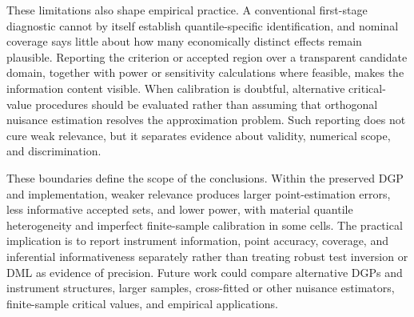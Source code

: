 These limitations also shape empirical practice. A conventional first-stage diagnostic cannot by itself establish quantile-specific identification, and nominal coverage says little about how many economically distinct effects remain plausible. Reporting the criterion or accepted region over a transparent candidate domain, together with power or sensitivity calculations where feasible, makes the information content visible. When calibration is doubtful, alternative critical-value procedures should be evaluated rather than assuming that orthogonal nuisance estimation resolves the approximation problem. Such reporting does not cure weak relevance, but it separates evidence about validity, numerical scope, and discrimination.

These boundaries define the scope of the conclusions. Within the preserved DGP and implementation, weaker relevance produces larger point-estimation errors, less informative accepted sets, and lower power, with material quantile heterogeneity and imperfect finite-sample calibration in some cells. The practical implication is to report instrument information, point accuracy, coverage, and inferential informativeness separately rather than treating robust test inversion or DML as evidence of precision. Future work could compare alternative DGPs and instrument structures, larger samples, cross-fitted or other nuisance estimators, finite-sample critical values, and empirical applications.
